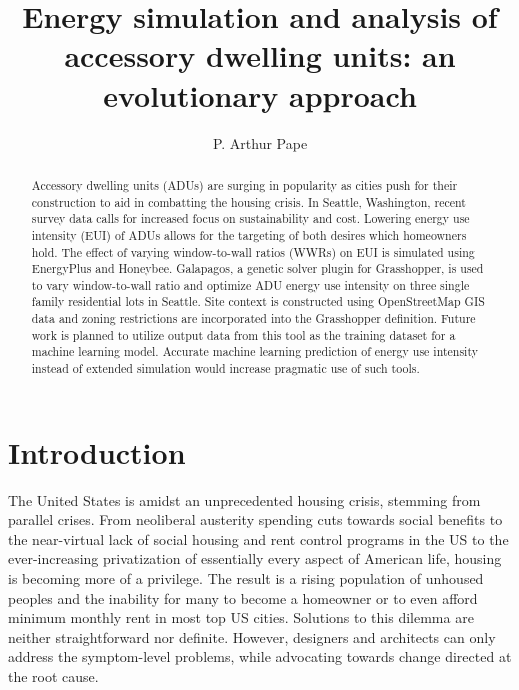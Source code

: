 \documentclass[sagev,times,Review,doublespace]{sagej}
\begin{document}

\title{Energy simulation and analysis of accessory dwelling units: 
an evolutionary approach}

\author{P. Arthur Pape}




\begin{abstract}
Accessory dwelling units (ADUs) are surging in popularity as cities push for their construction to aid in combatting the housing crisis. In Seattle, Washington, recent survey data calls for increased focus on sustainability and cost. Lowering energy use intensity (EUI) of ADUs allows for the targeting of both desires which homeowners hold. The effect of varying window-to-wall ratios (WWRs) on EUI is simulated using EnergyPlus and Honeybee. Galapagos, a genetic solver plugin for Grasshopper, is used to vary window-to-wall ratio and optimize ADU energy use intensity on three single family residential lots in Seattle. Site context is constructed using OpenStreetMap GIS data and zoning restrictions are incorporated into the Grasshopper definition. Future work is planned to utilize output data from this tool as the training dataset for a machine learning model. Accurate machine learning prediction of energy use intensity instead of extended simulation would increase pragmatic use of such tools.
\end{abstract}


\maketitle

\section{Introduction}
The United States is amidst an unprecedented housing crisis, stemming from parallel crises. From neoliberal austerity spending cuts towards social benefits to the near-virtual lack of social housing and rent control programs in the US to the ever-increasing privatization of essentially every aspect of American life\cite{10.2307/26297969}, housing is becoming more of a privilege. The result is a rising population of unhoused peoples and the inability for many to become a homeowner or to even afford minimum monthly rent in most top US cities. Solutions to this dilemma are neither straightforward nor definite. However, designers and architects can only address the symptom-level problems, while advocating towards change directed at the root cause.
\end{document}
